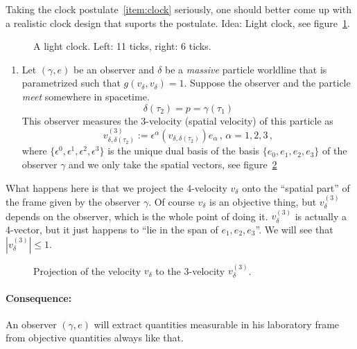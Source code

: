 Taking the clock postulate~\ref{item:clock} seriously,
one should better come up with a realistic clock design that suports the postulate.
Idea: Light clock, see figure~\ref{fig:lightClock}.
\begin{figure}[tbh]
    \centering{}
    
    \caption{A light clock. Left: 11 ticks, right: 6 ticks.}
    \label{fig:lightClock}
\end{figure}
\begin{enumerate}[resume, label=(\subscript{P}{{\arabic*}})]
    \item Let $(\gamma, e)$ be an observer and $\delta$ be a \textit{massive} particle worldline
        that is parametrized such that $g(v_\delta, v_\delta)=1$.
        Suppose the observer and the particle \textit{meet} somewhere in spacetime.
        \begin{equation}
            \delta(\tau_2) = p = \gamma(\tau_1)
        \end{equation}
        This observer measures the 3-velocity (spatial velocity) of this particle as 
        \begin{equation}
            v^{(3)}_{\delta, \delta(\tau_2)} := \epsilon^\alpha\left(v_{\delta, \delta(\tau_2)}\right)e_\alpha\,,
            \, \alpha = 1,2,3\,,
        \end{equation}
        where $\{\epsilon^0, \epsilon^1, \epsilon^2, \epsilon^3\}$ is the unique dual basis
        of the basis $\{e_0, e_1, e_2, e_3\}$ of the observer $\gamma$ and we only take the spatial vectors,
        see figure~\ref{fig:3velocity}
        \label{item:3velocity}
\end{enumerate}
\begin{note}
    What happens here is that we project the 4-velocity $v_\delta$ onto the ``spatial part'' of the
    frame given by the observer $\gamma$.
    Of course $v_\delta$ is an objective thing, but $v_\delta^{(3)}$ depends on the observer,
    which is the whole point of doing it.
    $v_\delta^{(3)}$ is actually a 4-vector, but it just happens to ``lie in the span of $e_1, e_2, e_3$''.
    We will see that $|v_\delta^{(3)}|\leq 1$.
\end{note}
\begin{figure}[tbh]
    \centering\def\svgwidth{\columnwidth}
    
    \caption{Projection of the velocity $v_\delta$ to the 3-velocity $v_\delta^{(3)}$.}
    \label{fig:3velocity}
\end{figure}
\paragraph{Consequence:}
An observer $(\gamma, e)$ will extract quantities measurable in his laboratory frame
from objective quantities always like that.

